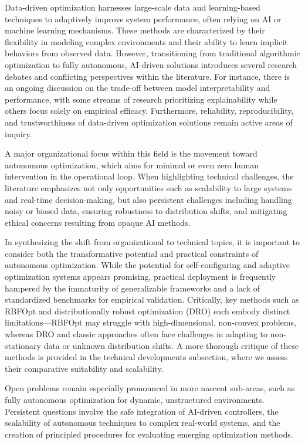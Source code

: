 \documentclass[sigconf]{acmart}
\begin{document}
Data-driven optimization harnesses large-scale data and learning-based techniques to adaptively improve system performance, often relying on AI or machine learning mechanisms. These methods are characterized by their flexibility in modeling complex environments and their ability to learn implicit behaviors from observed data. However, transitioning from traditional algorithmic optimization to fully autonomous, AI-driven solutions introduces several research debates and conflicting perspectives within the literature. For instance, there is an ongoing discussion on the trade-off between model interpretability and performance, with some streams of research prioritizing explainability while others focus solely on empirical efficacy. Furthermore, reliability, reproducibility, and trustworthiness of data-driven optimization solutions remain active areas of inquiry.

A major organizational focus within this field is the movement toward autonomous optimization, which aims for minimal or even zero human intervention in the operational loop. When highlighting technical challenges, the literature emphasizes not only opportunities such as scalability to large systems and real-time decision-making, but also persistent challenges including handling noisy or biased data, ensuring robustness to distribution shifts, and mitigating ethical concerns resulting from opaque AI methods.

In synthesizing the shift from organizational to technical topics, it is important to consider both the transformative potential and practical constraints of autonomous optimization. While the potential for self-configuring and adaptive optimization systems appears promising, practical deployment is frequently hampered by the immaturity of generalizable frameworks and a lack of standardized benchmarks for empirical validation. Critically, key methods such as RBFOpt and distributionally robust optimization (DRO) each embody distinct limitations—RBFOpt may struggle with high-dimensional, non-convex problems, whereas DRO and classic approaches often face challenges in adapting to non-stationary data or unknown distribution shifts. A more thorough critique of these methods is provided in the technical developments subsection, where we assess their comparative suitability and scalability.

Open problems remain especially pronounced in more nascent sub-areas, such as fully autonomous optimization for dynamic, unstructured environments. Persistent questions involve the safe integration of AI-driven controllers, the scalability of autonomous techniques to complex real-world systems, and the creation of principled procedures for evaluating emerging optimization methods.
\end{document}

